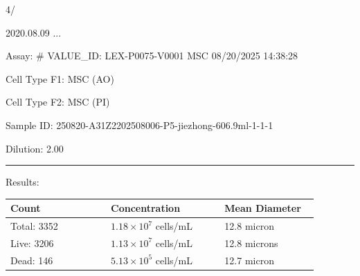 \documentclass[UTF8,10pt,a4paper,fontset=fandol]{ctexart}
\newcommand{\fieldvalue}[1]{#1}
\newcommand{\handwritten}[1]{#1}
\begin{document}
\handwritten{4/}

\handwritten{2020.08.09 ...}

\newpage

\noindent
Assay: %
# VALUE_ID: LEX-P0075-V0001
\fieldvalue{MSC}
\hfill
\fieldvalue{08/20/2025 14:38:28}

\medskip

\noindent
Cell Type F1: %
\fieldvalue{MSC (AO)}

\noindent
Cell Type F2: %
\fieldvalue{MSC (PI)}

\medskip

\noindent
Sample ID: %
\fieldvalue{250820-A31Z2202508006-P5-jiezhong-606.9ml-1-1-1}

\noindent
Dilution: %
\fieldvalue{2.00}

\medskip
\noindent\rule{\linewidth}{0.4pt}

\medskip
\noindent Results:

\medskip

\begin{tabular}{@{}p{0.30\linewidth}p{0.34\linewidth}p{0.28\linewidth}@{}}
\textbf{Count} & \textbf{Concentration} & \textbf{Mean Diameter} \\
\hline
Total: %
\fieldvalue{3352}
&
\fieldvalue{$1.18\times10^{7}$ cells/mL}
&
\fieldvalue{12.8 micron}
\\[2pt]
Live: %
\fieldvalue{3206}
&
\fieldvalue{$1.13\times10^{7}$ cells/mL}
&
\fieldvalue{12.8 microns}
\\[2pt]
Dead: %
\fieldvalue{146}
&
\fieldvalue{$5.13\times10^{5}$ cells/mL}
&
\fieldvalue{12.7 micron}
\end{tabular}
\end{document}
